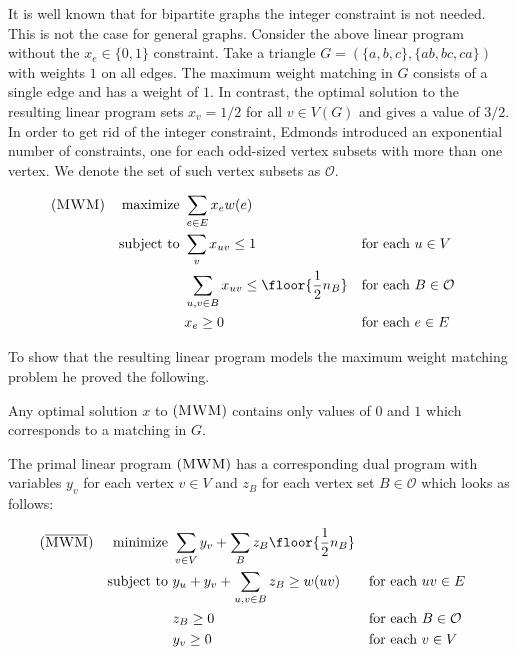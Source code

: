 It is well known that for bipartite graphs the integer constraint is not needed. This is not the case for general graphs. Consider the above linear program without the $x_e \in \{0,1\}$ constraint. Take a triangle $G = (\{a, b, c\}, \{ab, bc, ca\})$ with weights $1$ on all edges. The maximum weight matching in $G$ consists of a single edge and has a weight of $1$. In contrast, the optimal solution to the resulting linear program sets $x_v = 1/2$ for all $v \in V(G)$ and gives a value of $3/2$. In order to get rid of the integer constraint, Edmonds introduced an exponential number of constraints, one for each odd-sized vertex subsets with more than one vertex. We denote the set of such vertex subsets as $\mathcal{O}$.

\begin{align*}
(\textsc{MWM})
&&  \text{maximize }  & \sum_{e \in E} x_e w(e)\\
&& \text{subject to } & \sum_v x_{uv} \leq 1 &&\text{for each $u \in V$} \\
&&                    & \sum_{u, v \in B} x_{uv} \leq \floor{\frac{1}{2}n_B} &&\text{for each $B \in \mathcal{O}$} \\
&&                    & x_e \geq 0 &&\text{for each $e \in E$}
\end{align*}

To show that the resulting linear program models the maximum weight matching problem he proved the following.

\begin{theorem}
    Any optimal solution $x$ to $(\textsc{MWM})$ contains only values of $0$ and $1$ which corresponds to a matching in $G$.
\end{theorem}

The primal linear program $(\textsc{MWM})$ has a corresponding dual program with variables $y_v$ for each vertex $v \in V$ and $z_B$ for each vertex set $B \in \mathcal{O}$ which looks as follows:

\begin{align*}
(\overline{\textsc{MWM}})
&& \text{minimize }   & \sum_{v\in V}y_v + \sum_{B} z_B \floor{\frac{1}{2}n_B} \\
&& \text{subject to } & y_u + y_v + \sum_{u, v \in B} z_B \geq w(uv) &&\text{for each $uv \in E$} \\
&&                    & z_B \geq 0 &&\text{for each $B \in \mathcal{O}$} \\
&&                    & y_v \geq 0 &&\text{for each $v \in V$}
\end{align*}

